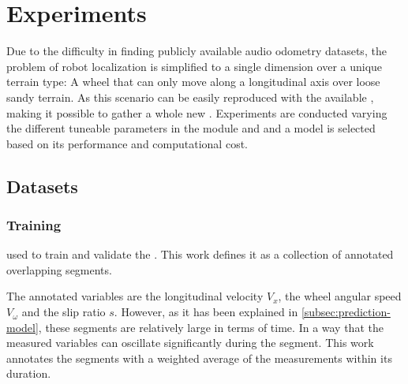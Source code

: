 \section{Experiments} \label{sec:experiments}

Due to the difficulty in finding publicly available audio odometry datasets,
the problem of robot localization is simplified to a single dimension over a
unique terrain type: A wheel that can only move along a longitudinal axis over
loose sandy terrain. As this scenario can be easily reproduced with the
available , making it possible
to gather a whole new . Experiments are conducted
varying the different tuneable parameters in the
 module and 
and a model is selected based on its performance and computational cost.



\subsection{Datasets} \label{subsec:datasets}

\subsubsection{Training} \label{subsubsec:training-dataset}
used to train and validate the . This work
defines it as a collection of annotated overlapping segments.

The annotated variables are the longitudinal velocity $V_x$, the wheel angular
speed $V_\omega$ and the slip ratio $s$. However, as it has been explained in
\cref{subsec:prediction-model}, these segments are relatively large in terms of
time. In a way that the measured variables can oscillate significantly during
the segment. This work annotates the segments with a weighted average of the
measurements within its duration.



